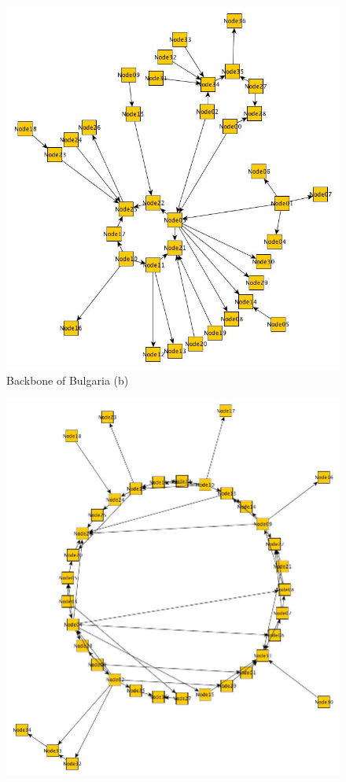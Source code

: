 \begin{figure}[h!]
\begin{minipage}[t]{0.4\textwidth}
      \includegraphics[width=\linewidth]{Bren.jpg}
      Backbone of Bulgaria (b)
   \end{minipage}
   \vspace{4ex}
    \begin{minipage}[c]{0.45\textwidth}
    \vspace{0pt}
    \includegraphics[width=\linewidth]{Geant2010.jpg}

\end{minipage}
\end{figure}
